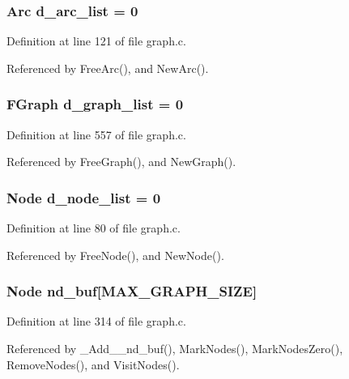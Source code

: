 \subsubsection{\setlength{\rightskip}{0pt plus 5cm}\bf{Arc} \bf{d\_\-arc\_\-list} = 0\hspace{0.3cm}{\tt  [static]}}\label{graph_8c_be744b8769bc9335808c8a78760662ec}




Definition at line 121 of file graph.c.

Referenced by Free\-Arc(), and New\-Arc().
\subsubsection{\setlength{\rightskip}{0pt plus 5cm}\bf{FGraph} \bf{d\_\-graph\_\-list} = 0\hspace{0.3cm}{\tt  [static]}}\label{graph_8c_b014cee194548614fcd179604a81c3f1}




Definition at line 557 of file graph.c.

Referenced by Free\-Graph(), and New\-Graph().
\subsubsection{\setlength{\rightskip}{0pt plus 5cm}\bf{Node} \bf{d\_\-node\_\-list} = 0\hspace{0.3cm}{\tt  [static]}}\label{graph_8c_0a2d292537d09b458a66b5b9187a81f6}




Definition at line 80 of file graph.c.

Referenced by Free\-Node(), and New\-Node().
\subsubsection{\setlength{\rightskip}{0pt plus 5cm}\bf{Node} \bf{nd\_\-buf}[MAX\_\-GRAPH\_\-SIZE]\hspace{0.3cm}{\tt  [static]}}\label{graph_8c_e8c171dd21b6981f9037ea32043c674e}




Definition at line 314 of file graph.c.

Referenced by \_\-Add\_\_\-nd\_\-buf(), Mark\-Nodes(), Mark\-Nodes\-Zero(), Remove\-Nodes(), and Visit\-Nodes().
